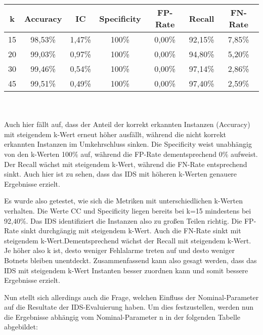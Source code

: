 \documentclass[main.tex]{subfiles}
\begin{document}
\begin{tabular}{|c|c|c|c|c|c|c|}\hline
k & Accuracy & IC & Specificity & FP-Rate & Recall & FN-Rate \\ \hline
15 & 98,53\% & 1,47\% & 100\% & 0,00\% & 92,15\% &7,85\% \\  \hline
20 & 99,03\% & 0,97\% & 100\% & 0,00\% & 94,80\% & 5,20\% \\  \hline
30 &  99,46\% & 0,54\% & 100\% & 0,00\% & 97,14\% & 2,86\% \\  \hline
45 & 99,51\% & 0,49\% & 100\% & 0,00\% & 97,40\% & 2,59\%\\  \hline
 \end{tabular} 

\ \\ \\ Auch hier fällt auf, dass der Anteil der korrekt erkannten Instanzen (Accuracy) mit steigendem k-Wert erneut höher ausfällt, während die nicht korrekt erkannten Instanzen im Umkehrschluss sinken. Die Specificity weist unabhängig von den k-Werten 100\% auf, während die FP-Rate dementsprechend 0\% aufweist. Der Recall wächst mit steigendem k-Wert, während die FN-Rate entsprechend sinkt. Auch hier ist zu sehen, dass das IDS mit höheren k-Werten genauere Ergebnisse erzielt.

Es wurde also getestet, wie sich die Metriken mit unterschiedlichen k-Werten verhalten. Die Werte CC und Specificity liegen bereits bei k=15 mindestens bei 92,40\%. Das IDS identifiziert die Instanzen also zu großen Teilen richtig. Die FP-Rate sinkt durchgängig mit steigendem k-Wert. Auch die FN-Rate sinkt mit steigendem k-Wert.Dementsprechend wächst der Recall mit steigendem k-Wert. Je höher also k ist, desto weniger Fehlalarme treten auf und desto weniger Botnets bleiben unentdeckt. 
Zusammenfassend kann also gesagt werden, dass das IDS mit steigendem k-Wert Instanten besser zuordnen kann und somit bessere Ergebnisse erzielt. 

Nun stellt sich allerdings auch die Frage, welchen Einfluss der Nominal-Parameter auf die Resultate der IDS-Evaluierung haben. Um dies festzustellen, werden nun die Ergebnisse abhängig vom Nominal-Parameter n  in der folgenden Tabelle abgebildet: \\
\end{document}
